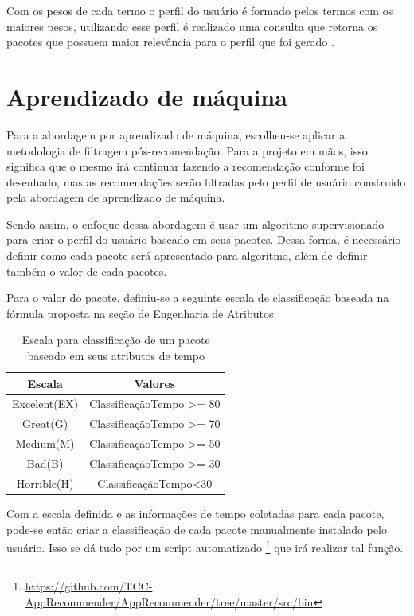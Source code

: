 Com os pesos de cada termo o perfil do usuário é formado pelos termos com
os maiores pesos, utilizando esse perfil é realizado uma consulta que
retorna os pacotes que possuem maior relevância para o perfil que foi
gerado \cite{araujo2011apprecommender}.


\section{Aprendizado de máquina}

Para a abordagem por aprendizado de máquina, escolheu-se aplicar a
metodologia de filtragem pós-recomendação. Para a projeto em mãos, isso
significa que o mesmo irá continuar fazendo a recomendação conforme foi
desenhado, mas as recomendações serão filtradas pelo perfil de usuário
construído pela abordagem de aprendizado de máquina.

Sendo assim, o enfoque dessa abordagem é usar um algoritmo supervisionado
para criar o perfil do usuário baseado em seus pacotes. Dessa forma, é
necessário definir como cada pacote será apresentado para algoritmo, além de
definir também o valor de cada pacotes.

Para o valor do pacote, definiu-se a seguinte escala de classificação baseada na
fórmula proposta na seção de Engenharia de Atributos:

\begin{table}[h]
\centering
\begin{tabular}{cc}
\hline
\rowcolor[HTML]{EFEFEF}
{Escala} & {Valores} \\ \hline
{Excelent(EX)}  & ClassificaçãoTempo >= 80                  \\ \hline
{Great(G)}   & ClassificaçãoTempo >= 70                  \\ \hline
{Medium(M)}   & ClassificaçãoTempo >= 50                  \\ \hline
{Bad(B)}   & ClassificaçãoTempo >= 30                  \\ \hline
{Horrible(H)}   &ClassificaçãoTempo<30                   \\ \hline
\end{tabular}
\caption{Escala para classificação de um pacote baseado em seus atributos de tempo}
\label{tab:cwe476-erros}
\end{table}


Com a escala definida e as informações de tempo coletadas para cada pacote,
pode-se então criar a classificação de cada pacote manualmente instalado pelo usuário.
Isso se dá tudo por um script automatizado \footnote{\url{https://github.com/TCC-AppRecommender/AppRecommender/tree/master/src/bin}}
que irá realizar tal função.

